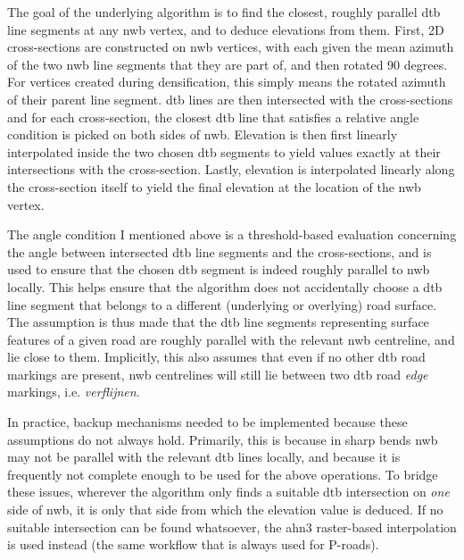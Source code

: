 The goal of the underlying algorithm is to find the closest, roughly parallel \ac{dtb} line segments at any \ac{nwb} vertex, and to deduce elevations from them. First, 2D cross-sections are constructed on \ac{nwb} vertices, with each given the mean azimuth of the two \ac{nwb} line segments that they are part of, and then rotated 90 degrees. For vertices created during densification, this simply means the rotated azimuth of their parent line segment. \ac{dtb} lines are then intersected with the cross-sections and for each cross-section, the closest \ac{dtb} line that satisfies a relative angle condition is picked on both sides of \ac{nwb}. Elevation is then first linearly interpolated inside the two chosen \ac{dtb} segments to yield values exactly at their intersections with the cross-section. Lastly, elevation is interpolated linearly along the cross-section itself to yield the final elevation at the location of the \ac{nwb} vertex.

The angle condition I mentioned above is a threshold-based evaluation concerning the angle between intersected \ac{dtb} line segments and the cross-sections, and is used to ensure that the chosen \ac{dtb} segment is indeed roughly parallel to \ac{nwb} locally. This helps ensure that the algorithm does not accidentally choose a \ac{dtb} line segment that belongs to a different (underlying or overlying) road surface. The assumption is thus made that the \ac{dtb} line segments representing surface features of a given road are roughly parallel with the relevant \ac{nwb} centreline, and lie close to them. Implicitly, this also assumes that even if no other \ac{dtb} road markings are present, \ac{nwb} centrelines will still lie between two \ac{dtb} road \textit{edge} markings, i.e. \textit{verflijnen}.

In practice, backup mechanisms needed to be implemented because these assumptions do not always hold. Primarily, this is because in sharp bends \ac{nwb} may not be parallel with the relevant \ac{dtb} lines locally, and because it is frequently not complete enough to be used for the above operations. To bridge these issues, wherever the algorithm only finds a suitable \ac{dtb} intersection on \textit{one} side of \ac{nwb}, it is only that side from which the elevation value is deduced. If no suitable intersection can be found whatsoever, the \ac{ahn3} raster-based interpolation is used instead (the same workflow that is always used for P-roads).


